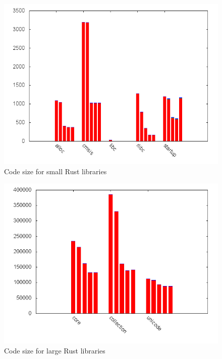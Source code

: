\begin{figure}[H]
  \begin{center}
    \includegraphics[scale=0.3]{results/plots/size/lib/small/size.png}
  \end{center}
  \caption{Code size for small Rust libraries}
  \label{fig:size:lib:small}
\end{figure}
\begin{figure}[H]
  \begin{center}
    \includegraphics[scale=0.3]{results/plots/size/lib/large/size.png}
  \end{center}
  \caption{Code size for large Rust libraries}
  \label{fig:size:lib:large}
\end{figure}

